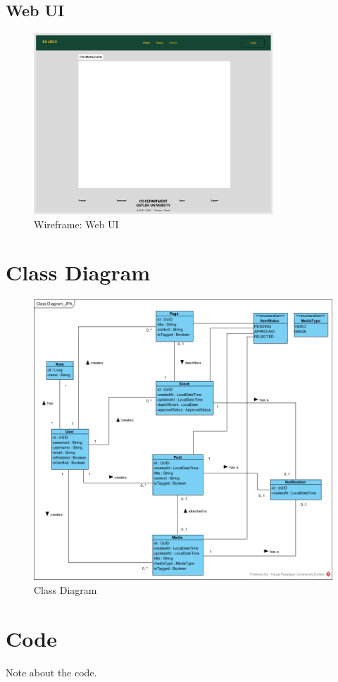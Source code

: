 \documentclass{article}
\begin{document}
\subsection{Web UI}
\begin{figure}[H]
    \centering
    \includegraphics[width=0.8\textwidth]{images/wireframe_webUI.png}
    \centering
    \caption{Wireframe: Web UI}
\end{figure}
\section{Class Diagram}
\begin{figure}[H]
    \centering
    \includegraphics[width=.98\textwidth]{images/ClassDiagram.png}
    \centering
    \caption{Class Diagram}
\end{figure}%
\section{Code}
Note about the code.
\end{document}
